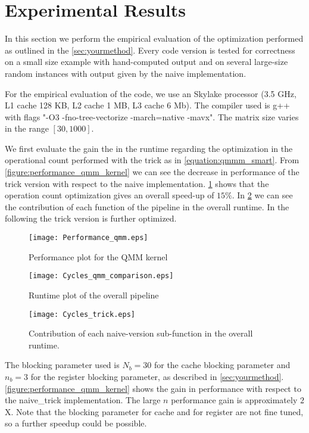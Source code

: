 \section{Experimental Results}\label{sec:exp}
\graphicspath{{../../plots/}}

In this section we perform the empirical evaluation of the optimization performed as outlined in the \cref{sec:yourmethod}. Every code version is tested for correctness on a small size example with hand-computed output and on several large-size random instances with output given by the naive implementation.

For the empirical evaluation of the code, we use an Skylake processor (3.5 GHz, L1 cache 128 KB, L2 cache 1 MB, L3 cache 6 Mb). The compiler used is g++ with flags "-O3 -fno-tree-vectorize -march=native -mavx". The matrix size varies in the range $[30,1000]$.

We first evaluate the gain the in the runtime regarding the optimization in the operational count performed with the trick as in \cref{equation:qmmm_smart}. From \cref{figure:performance_qmm_kernel} we can see the decrease in performance of the trick version with respect to the naive implementation. \cref{figure:cycles_qmm_comparison} shows that the operation count optimization gives an overall speed-up of $15 \%$. In \cref{figure:Cycles_trick} we can see the contribution of each function of the pipeline in the overall runtime. In the following the trick version is further optimized.

\begin{figure}[h]
\texttt{[image: Performance\_qmm.eps]}
\caption{Performance plot for the QMM kernel}
\label{figure:performance_qmm_kernel}

\texttt{[image: Cycles\_qmm\_comparison.eps]}
\caption{Runtime plot of the overall pipeline}
\label{figure:cycles_qmm_comparison}
\end{figure}

\begin{figure}[h]
\texttt{[image: Cycles\_trick.eps]}
\caption{Contribution of each naive-version sub-function in the overall runtime.} 
\label{figure:Cycles_trick}
\end{figure}


The blocking parameter used is $N_b = 30$ for the cache blocking parameter and $n_b = 3$ for the register blocking parameter, as described in \cref{sec:yourmethod}. \cref{figure:performance_qmm_kernel} shows the gain in performance with respect to the naive\_trick implementation. The large $n$ performance gain is approximately $2$X. Note that the blocking parameter for cache and for register are not fine tuned, so a further speedup could be possible.


